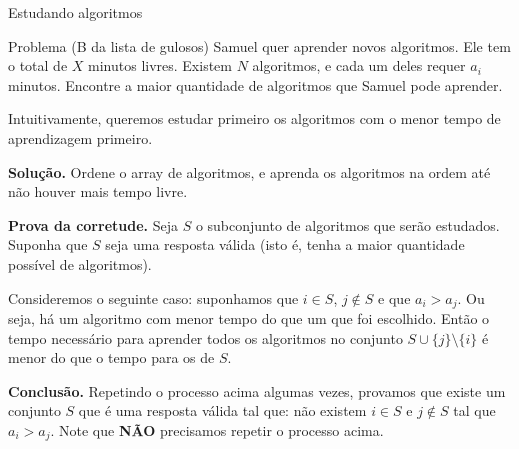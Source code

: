 \begin{frame}{Estudando algoritmos}

    \begin{block}{Problema (B da lista de gulosos)}
        Samuel quer aprender novos algoritmos. Ele tem o total de $X$ minutos livres. Existem $N$ algoritmos, e cada um deles requer $a_i$ minutos. Encontre a maior quantidade de algoritmos que Samuel pode aprender.
    \end{block}

     {
    \pause Intuitivamente, queremos estudar primeiro os algoritmos com o menor tempo de aprendizagem primeiro. \pause
    
    {\bf Solução.} Ordene o array de algoritmos, e aprenda os algoritmos na ordem até não houver mais tempo livre.
    }

     {
    {\bf Prova da corretude.} Seja $S$ o subconjunto de algoritmos que serão estudados. Suponha que $S$ seja uma resposta válida (isto é, tenha a maior quantidade possível de algoritmos). \pause

    Consideremos o seguinte caso: suponhamos que $i \in S$, $j \not\in S$ e que $a_i > a_j$. \pause Ou seja, há um algoritmo com menor tempo do que um que foi escolhido. Então o tempo necessário para aprender todos os algoritmos no conjunto $S \cup \{j\} \setminus \{i\}$ é menor do que o tempo para os de $S$. \pause
    
    {\bf Conclusão.} Repetindo o processo acima algumas vezes, provamos que existe um conjunto $S$ que é uma resposta válida tal que: não existem $i \in S$ e $j \not\in S$ tal que $a_i > a_j$. \pause Note que {\bf NÃO} precisamos repetir o processo acima.
    }
\end{frame}

